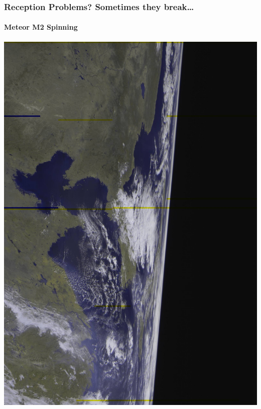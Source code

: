 \documentclass[]{beamer}
\begin{document}
\begin{frame}
    \frametitle{Reception Problems? Sometimes they break\dots}
    \framesubtitle{Meteor M2 Spinning}
    \begin{center}
        \includegraphics[width=0.75\paperwidth,height=0.75\paperheight,keepaspectratio]{images/meteor-spin.jpg}
    \end{center}
\end{frame}
\end{document}
